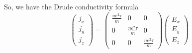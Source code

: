 \documentclass[a4paper]{article}
\begin{document}
So, we have the Drude conductivity formula 
\begin{equation}
	\begin{pmatrix} j_x\\ j_y\\ j_z \end{pmatrix}
	= \begin{pmatrix} 
	\frac{ne^2\tau}{m} & 0 & 0\\
0 & \frac{ne^2\tau}{m} & 0 \\
0 & 0 & \frac{ne^2\tau}{m}\end{pmatrix} 
\begin{pmatrix} E_x\\E_y\\E_z \end{pmatrix} 
\end{equation}
\end{document}
